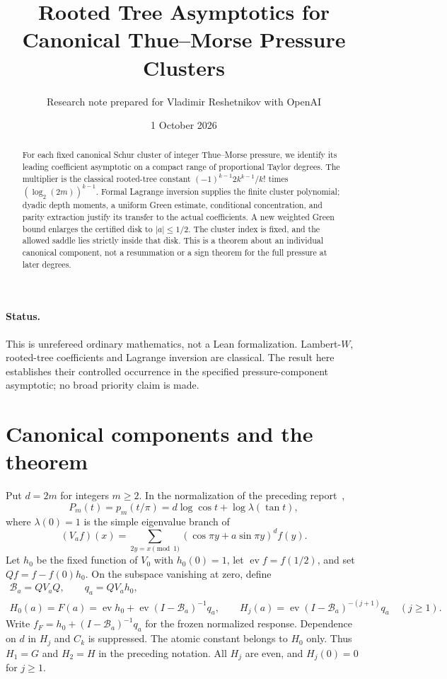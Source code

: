 \documentclass[11pt,a4paper]{article}
\title{Rooted Tree Asymptotics for\\Canonical Thue--Morse Pressure Clusters}
\author{Research note prepared for Vladimir Reshetnikov with OpenAI}
\date{1 October 2026}
\theoremstyle{remark}\newtheorem*{ednote}{Editorial note (ProveIt, 2026-10-01)}
\newcommand{\ev}{\operatorname{ev}}\newcommand{\GG}{\mathcal G}
\begin{document}
\maketitle
\begin{abstract}
For each fixed canonical Schur cluster of integer Thue--Morse pressure, we identify its leading coefficient asymptotic on a compact range of proportional Taylor degrees. The multiplier is the classical rooted-tree constant $(-1)^{k-1}2k^{k-1}/k!$ times $(\log_2(2m))^{k-1}$. Formal Lagrange inversion supplies the finite cluster polynomial; dyadic depth moments, a uniform Green estimate, conditional concentration, and parity extraction justify its transfer to the actual coefficients. A new weighted Green bound enlarges the certified disk to $|a|\le1/2$. The cluster index is fixed, and the allowed saddle lies strictly inside that disk. This is a theorem about an individual canonical component, not a resummation or a sign theorem for the full pressure at later degrees.
\end{abstract}
\paragraph{Status.} This is unrefereed ordinary mathematics, not a Lean formalization. Lambert-$W$, rooted-tree coefficients and Lagrange inversion are classical. The result here establishes their controlled occurrence in the specified pressure-component asymptotic; no broad priority claim is made.

\section{Canonical components and the theorem}
Put $d=2m$ for integers $m\ge2$. In the normalization of the preceding report~\cite{First},
\[
 P_m(t)=p_m(t/\pi)=d\log\cos t+\log\lambda(\tan t),
\]
where $\lambda(0)=1$ is the simple eigenvalue branch of
\[
 (V_af)(x)=\sum_{2y=x\pmod1}(\cos\pi y+a\sin\pi y)^d f(y).
\]
Let $h_0$ be the fixed function of $V_0$ with $h_0(0)=1$, let $\ev f=f(1/2)$, and set $Qf=f-f(0)h_0$. On the subspace vanishing at zero, define
\begin{gather*}
 \mathcal B_a=QV_aQ,\qquad q_a=QV_ah_0,\\
 H_0(a)=F(a)=\ev h_0+\ev(I-\mathcal B_a)^{-1}q_a,\qquad
 H_j(a)=\ev(I-\mathcal B_a)^{-(j+1)}q_a\quad(j\ge1).
\end{gather*}
Write $f_F=h_0+(I-\mathcal B_a)^{-1}q_a$ for the frozen normalized response. Dependence on $d$ in $H_j$ and $C_k$ is suppressed. The atomic constant belongs to $H_0$ only. Thus $H_1=G$ and $H_2=H$ in the preceding notation. All $H_j$ are even, and $H_j(0)=0$ for $j\ge1$.
\end{document}
